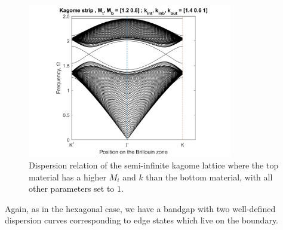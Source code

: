 \begin{figure}[!h]
\centering
\includegraphics[width=0.8\textwidth]{imgs/kagomestripperturbed.png}
\caption{\label{fig:kagomeperturbed} Dispersion relation of the semi-infinite
  kagome lattice where the top material has a higher $M_i$ and $k$ than the
  bottom material, with all other parameters set to $1$.}
\end{figure}

Again, as in the hexagonal case, we have a bandgap with two well-defined
dispersion curves corresponding to edge states which live on the boundary.
